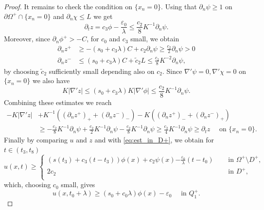 \documentclass[12pt]{article}
\numberwithin{Theorem}{section}
\theoremstyle{definition}
\theoremstyle{remark}
\numberwithin{equation}{section}
\newcommand{\p}{\partial}
\newcommand{\eps}{\varepsilon}
\begin{document}
\begin{proof}
It remains to check the condition on $\{ x_n=0\}$. 
Using that $\p_n \psi \geq 1$ on $\p \Omega^+ \cap \{x_n=0 \}$ and $\p_n\chi\leq L$ we get
\begin{equation}
    \p_t z = c_3 \phi   -\frac{\eps_0}{\lambda} \leq \frac{c_2}{8} K^{-1} \p_n \psi.
\end{equation}
Moreover, since $\p_n \phi^+ >-C$, for $c_0$ and $c_3$ small, we obtain
\begin{align*}
    \p_n z^+&\geq - (s_0 + c_3\lambda)C + c_2 \p_n\psi \geq \frac{c_2}{2} \p_n\psi > 0 \\
    \p_n z^- &\leq (s_0 + c_3\lambda)C +\tilde c_2 L \leq \frac{c_2}{8}K^{-2} \p_n\psi,
\end{align*}
by choosing $\tilde c_2$ sufficiently small depending also on $c_2$.
Since $\nabla'\psi= 0,\nabla' \chi=0$ on $\{x_n=0 \}$ we also have
\[
K|\nabla' z| \leq (s_0 + c_3\lambda)K |\nabla' \phi| \leq \frac{c_2}{8} K^{-1} \p_n \psi .
 \]
Combining these estimates we reach 
\begin{align*}
   -K|\nabla 'z| &+ K^{-1}  \left( (\p_n z^+)_+ + (\p_n z^-)_- \right) - K \left( (\p_n z^+)_-  +(\p_n z^-)_+ \right) \\
   &\geq 
-\frac{c_2}{8} K^{-1} \p_n \psi  +\frac{c_2}{2}K^{-1} \p_n \psi  -\frac{c_2}{8} K^{-1} \p_n \psi \geq \frac{c_2}{4}K^{-1} \p_n \psi \geq \p_t z \quad \text{ on }\{x_n=0\}.
\end{align*}
Finally by comparing $u$ and $z$ and with \eqref{eq:est_in_D+}, we obtain for $t \in (t_3, t_8)$
\begin{equation} \label{eq:1111}
    u(x,t) \geq \begin{cases}
        \left(s(t_3) + c_3(t- t_3) \right) \phi(x) + c_2 \psi(x)  {-\frac{\eps_0}{\lambda}(t-t_0)} \quad &\text{ in } \Omega^+ \setminus D^+, \\
        2c_2 \quad &\text{ in } D^+, \\
    \end{cases}
\end{equation}
which, choosing $c_0$ small, gives
\begin{equation}
    u(x,t_0+\lambda) \geq \left( s_0 + c_0 \lambda\right) \phi(x) -\eps_0 \quad \text{ in  }Q_1^+. 
\end{equation}



\end{proof}
\end{document}
